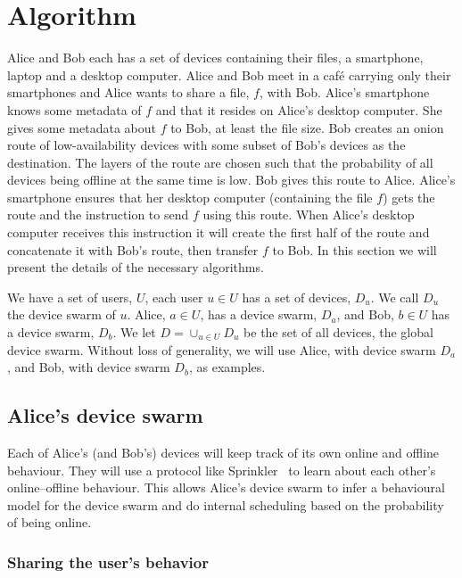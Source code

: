 \section{Algorithm}%
\label{Algorithm}

Alice and Bob each has a set of devices containing their files, \eg a 
smartphone, laptop and a desktop computer.
Alice and Bob meet in a café carrying only their smartphones and Alice wants to 
share a file, \(f\), with Bob.
Alice's smartphone knows some metadata of \(f\) and that it resides on Alice's 
desktop computer.
She gives some metadata about \(f\) to Bob, at least the file size.
Bob creates an onion route of low-availability devices with some subset of Bob's 
devices as the destination.
The layers of the route are chosen such that the probability of all devices 
being offline at the same time is low.
Bob gives this route to Alice.
Alice's smartphone ensures that her desktop computer (containing the file \(f\)) 
gets the route and the instruction to send \(f\) using this route.
When Alice's desktop computer receives this instruction it will create the first 
half of the route and concatenate it with Bob's route, then transfer \(f\) to 
Bob.
In this section we will present the details of the necessary algorithms.

We have a set of users, \(U\), each user \(u\in U\) has a set of devices, 
\(D_u\).
We call \(D_u\) the device swarm of \(u\).
Alice, \(a\in U\), has a device swarm, \(D_a\), and Bob, \(b\in U\) has a device 
swarm, \(D_b\).
We let \(D = \cup_{u\in U} D_u\) be the set of all devices, the global device 
swarm.
Without loss of generality, we will use Alice, with device swarm \(D_a\), and 
Bob, with device swarm \(D_b\), as examples.

\subsection{Alice's device swarm}%
\label{local-swarm}

Each of Alice's (and Bob's) devices will keep track of its own online and 
offline behaviour.
They will use a protocol like Sprinkler~\cite{luxey:hal-01704172} to learn about 
each other's online--offline behaviour.
This allows Alice's device swarm to infer a behavioural model for the device 
swarm and do internal scheduling based on the probability of being online.

\subsubsection{Sharing the user's behavior}%
\label{ssub:sharing_the_user_s_behavior}

